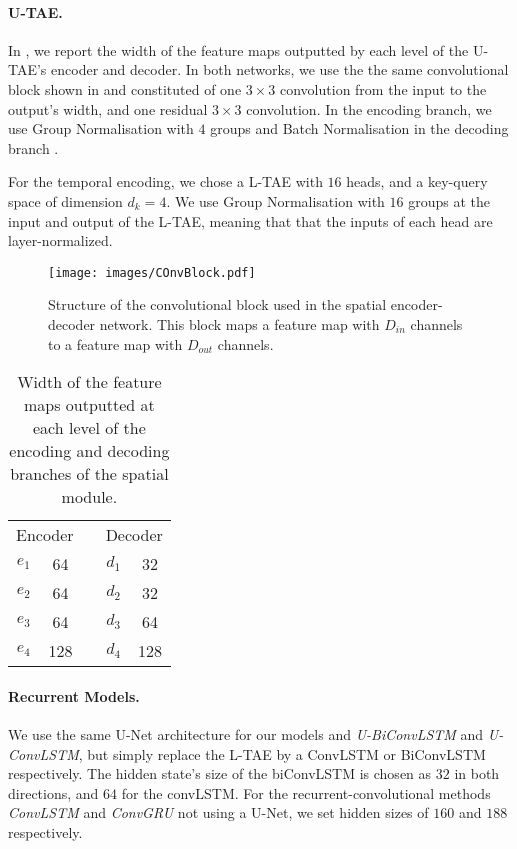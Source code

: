 \paragraph{U-TAE.} 
In , we report the width of the feature maps outputted by each level of the U-TAE's encoder and decoder.
In both networks, we use the the same convolutional block shown in  and constituted of one $3\times3$ convolution from the input to the output's width, and one residual $3\times3$ convolution. In the encoding branch, we use Group Normalisation with $4$ groups and Batch Normalisation in the decoding branch .

For the temporal encoding, we chose a L-TAE with $16$ heads, and a key-query space of dimension $d_k=4$. We use Group Normalisation with $16$ groups at the input and output of the L-TAE, meaning that that the inputs of each head are layer-normalized.


\begin{figure}[h!]
    \centering
    \texttt{[image: images/COnvBlock.pdf]}
    \caption{Structure of the convolutional block used in the spatial encoder-decoder network. This block maps a feature map with $D_{in}$ channels to a feature map with $D_{out}$ channels. }
    \label{fig:convlblock}
\end{figure}


\begin{table}[]
    \centering
    \caption{Width of the feature maps outputted at each level of the encoding and decoding branches of the spatial module.}
    \begin{tabular}{ccccc}
      \multicolumn{2}{c}{Encoder}&\phantom{a}&\multicolumn{2}{c}{Decoder}\\\cmidrule{1-2}\cmidrule{4-5}
       $e_1$ & 64 && $d_1$ & 32 \\
        $e_2$ & 64 && $d_2$ & 32 \\
       $e_3$ & 64 && $d_3$ & 64 \\
       $e_4$ & 128 && $d_4$ & 128 \\
    \end{tabular}
    \label{tab:unet_conf}
\end{table}

\paragraph{Recurrent Models.} 
We use the same U-Net architecture for our models and \emph{U-BiConvLSTM} and \emph{U-ConvLSTM}, but simply replace the L-TAE by a ConvLSTM or BiConvLSTM respectively. The hidden state's size of the biConvLSTM is chosen as $32$ in both directions, and $64$ for the convLSTM.
For the recurrent-convolutional methods \emph{ConvLSTM} and \emph{ConvGRU} not using a U-Net, we set hidden sizes of $160$ and $188$ respectively. 


